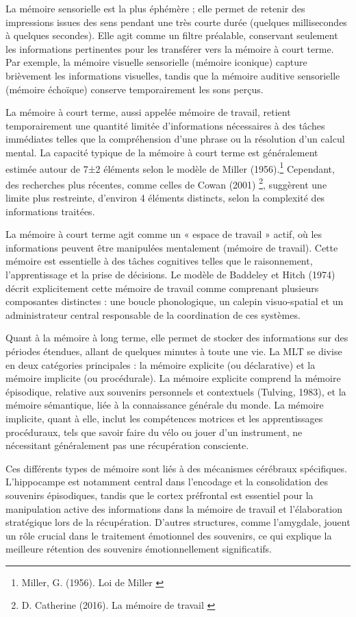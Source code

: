 \documentclass[11pt,a4paper]{report}
\begin{document}
La mémoire sensorielle est la plus éphémère ; elle permet de retenir des impressions issues des sens pendant une très courte durée (quelques millisecondes à quelques secondes). Elle agit comme un filtre préalable, conservant seulement les informations pertinentes pour les transférer vers la mémoire à court terme. Par exemple, la mémoire visuelle sensorielle (mémoire iconique) capture brièvement les informations visuelles, tandis que la mémoire auditive sensorielle (mémoire échoïque) conserve temporairement les sons perçus.

La mémoire à court terme, aussi appelée mémoire de travail, retient temporairement une quantité limitée d’informations nécessaires à des tâches immédiates telles que la compréhension d'une phrase ou la résolution d’un calcul mental. La capacité typique de la mémoire à court terme est généralement estimée autour de 7±2 éléments selon le modèle de Miller (1956).\footnote{Miller, G. (1956). Loi de Miller \cite{miller}} Cependant, des recherches plus récentes, comme celles de Cowan (2001) \footnote{D. Catherine (2016). La mémoire de travail \cite{demoulin}}, suggèrent une limite plus restreinte, d'environ 4 éléments distincts, selon la complexité des informations traitées.

La mémoire à court terme agit comme un « espace de travail » actif, où les informations peuvent être manipulées mentalement (mémoire de travail). Cette mémoire est essentielle à des tâches cognitives telles que le raisonnement, l'apprentissage et la prise de décisions. Le modèle de Baddeley et Hitch (1974) décrit explicitement cette mémoire de travail comme comprenant plusieurs composantes distinctes : une boucle phonologique, un calepin visuo-spatial et un administrateur central responsable de la coordination de ces systèmes.

Quant à la mémoire à long terme, elle permet de stocker des informations sur des périodes étendues, allant de quelques minutes à toute une vie. La MLT se divise en deux catégories principales : la mémoire explicite (ou déclarative) et la mémoire implicite (ou procédurale). La mémoire explicite comprend la mémoire épisodique, relative aux souvenirs personnels et contextuels (Tulving, 1983), et la mémoire sémantique, liée à la connaissance générale du monde. La mémoire implicite, quant à elle, inclut les compétences motrices et les apprentissages procéduraux, tels que savoir faire du vélo ou jouer d'un instrument, ne nécessitant généralement pas une récupération consciente.

Ces différents types de mémoire sont liés à des mécanismes cérébraux spécifiques. L'hippocampe est notamment central dans l'encodage et la consolidation des souvenirs épisodiques, tandis que le cortex préfrontal est essentiel pour la manipulation active des informations dans la mémoire de travail et l’élaboration stratégique lors de la récupération. D'autres structures, comme l'amygdale, jouent un rôle crucial dans le traitement émotionnel des souvenirs, ce qui explique la meilleure rétention des souvenirs émotionnellement significatifs.
\end{document}
